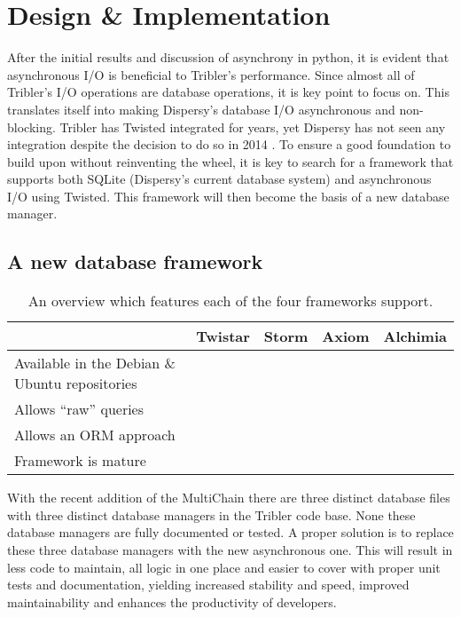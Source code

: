 \chapter{Design \& Implementation}

After the initial results and discussion of asynchrony in python, it is evident that asynchronous I/O is beneficial to Tribler's performance.
Since almost all of Tribler's I/O operations are database operations, it is key point to focus on.
This translates itself into making Dispersy's database I/O asynchronous and non-blocking.
Tribler has Twisted integrated for years, yet Dispersy has not seen any integration despite the decision to do so in 2014 \cite{pouwelse2013consider}.
To ensure a good foundation to build upon without reinventing the wheel, it is key to search for a framework that supports both SQLite (Dispersy's current database system) and asynchronous I/O using Twisted.
This framework will then become the basis of a new database manager.

\section{A new database framework}

\begin{table}[]
	\centering
	\caption{An overview which features each of the four frameworks support.}
	\label{table:database_frameworks_comparison}
	\begin{tabular}{l|c|c|c|c|}
		\cline{2-5}
		& \textbf{Twistar} & \textbf{Storm} & \textbf{Axiom} & \textbf{Alchimia} \\ \hline
	\multicolumn{1}{|p{4cm}|}{Available in the Debian \& Ubuntu repositories} 	& \xmark & \cmark & \cmark & \xmark \\ \hline
	\multicolumn{1}{|l|}{Allows \enquote{raw} queries} 							& \cmark & \cmark & \cmark & \cmark \\ \hline
	\multicolumn{1}{|l|}{Allows an ORM approach} 								& \cmark & \cmark & \cmark & \xmark \\ \hline
	\multicolumn{1}{|l|}{Framework is mature} 									& \cmark & \cmark & \cmark & \xmark \\ \hline
	\end{tabular}
\end{table}

With the recent addition of the MultiChain there are three distinct database files with three distinct database managers in the Tribler code base.
None these database managers are fully documented or tested.
A proper solution is to replace these three database managers with the new asynchronous one.
This will result in less code to maintain, all logic in one place and easier to cover with proper unit tests and documentation, yielding increased stability and speed, improved maintainability and enhances the productivity of developers.

